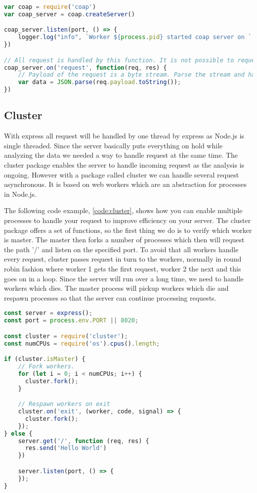 \documentclass[USenglish]{ifimaster}  %
\begin{document}
\begin{lstlisting}[caption={Base \acrshort{coap} setup},label={code:coap},language=JavaScript]
var coap = require('coap')
var coap_server = coap.createServer()

coap_server.listen(port, () => {
    logger.log("info", `Worker ${process.pid} started coap server on ` + port);
})

// All request is handled by this function. It is not possible to request a specific url path
coap_server.on('request', function(req, res) {
    // Payload of the request is a byte stream. Parse the stream and handle the data
    var data = JSON.parse(req.payload.toString());
})
\end{lstlisting}

\subsection{Cluster}
With express all request will be handled by one thread by express as Node.js is single threaded. Since the server basically puts everything on hold while analyzing the data we needed a way to handle request at the same time. The cluster package enables the server to handle incoming request as the analysis is ongoing. However with a package called cluster we can handle several request asynchronous\cite{npm:cluster}. It is based on web workers which are an abstraction for processes in Node.js.

The following code example, \vref{code:cluster}, shows how you can enable multiple processes to handle your request to improve efficiency on your server. The cluster package offers a set of functions, so the first thing we do is to verify which worker is master. The master then forks a number of processes which then will request the path '/' and listen on the specified port. To avoid that all workers handle every request, cluster passes request in turn to the workers, normally in round robin fashion where worker 1 gets the first request, worker 2 the next and this goes on in a loop. Since the server will run over a long time, we need to handle workers which dies. The master process will pickup workers which die and respawn processes so that the server can continue processing requests.

\begin{lstlisting}[caption={Express setup with cluster},label={code:cluster},language=JavaScript]
const server = express();
const port = process.env.PORT || 8020;

const cluster = require('cluster');
const numCPUs = require('os').cpus().length;

if (cluster.isMaster) {
    // Fork workers.
    for (let i = 0; i < numCPUs; i++) {
      cluster.fork();
    }

    // Respawn workers on exit
    cluster.on('exit', (worker, code, signal) => {
      cluster.fork();
    });
} else {
    server.get('/', function (req, res) {
      res.send('Hello World')
    })

    server.listen(port, () => {
    });
}
\end{lstlisting}
\end{document}
